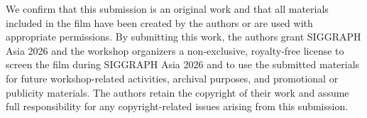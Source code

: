 \documentclass[sigconf]{acmart}
\begin{document}
We confirm that this submission is an original work and that all materials included in the film have been created by the authors or are used with appropriate permissions. By submitting this work, the authors grant SIGGRAPH Asia 2026 and the workshop organizers a non-exclusive, royalty-free license to screen the film during SIGGRAPH Asia 2026 and to use the submitted materials for future workshop-related activities, archival purposes, and promotional or publicity materials. The authors retain the copyright of their work and assume full responsibility for any copyright-related issues arising from this submission.



\end{document}
